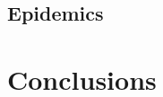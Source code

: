 \documentclass[10pt,a4paper]{article}
\begin{document}
\subsection{Epidemics}






\section{Conclusions}

\end{document}
